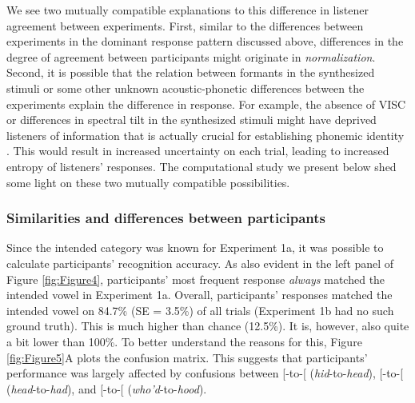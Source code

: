 \documentclass[preprint]{JASA}
\begin{document}
We see two mutually compatible explanations to this difference in listener agreement between experiments. First, similar to the differences between experiments in the dominant response pattern discussed above, differences in the degree of agreement between participants might originate in \emph{normalization}. Second, it is possible that the relation between formants in the synthesized stimuli or some other unknown acoustic-phonetic differences between the experiments explain the difference in response. For example, the absence of VISC or differences in spectral tilt in the synthesized stimuli might have deprived listeners of information that is actually crucial for establishing phonemic identity \citep{hillenbrand-nearey1999}. This would result in increased uncertainty on each trial, leading to increased entropy of listeners' responses. The computational study we present below shed some light on these two mutually compatible possibilities.

\subsubsection{Similarities and differences between participants}\label{similarities-and-differences-between-participants}

Since the intended category was known for Experiment 1a, it was possible to calculate participants' recognition accuracy. As also evident in the left panel of Figure \ref{fig:Figure4}, participants' most frequent response \emph{always} matched the intended vowel in Experiment 1a. Overall, participants' responses matched the intended vowel on 84.7\% (SE = 3.5\%) of all trials (Experiment 1b had no such ground truth). This is much higher than chance (12.5\%). It is, however, also quite a bit lower than 100\%. To better understand the reasons for this, Figure \ref{fig:Figure5}A plots the confusion matrix. This suggests that participants' performance was largely affected by confusions between {[}\textipa{I}{]}-to-{[}\textipa{E}{]} (\emph{hid}-to-\emph{head}), {[}\textipa{E}{]}-to-{[}\textipa{ae}{]} (\emph{head}-to-\emph{had}), and {[}\textipa{u}{]}-to-{[}\textipa{U}{]} (\emph{who'd}-to-\emph{hood}).
\end{document}
